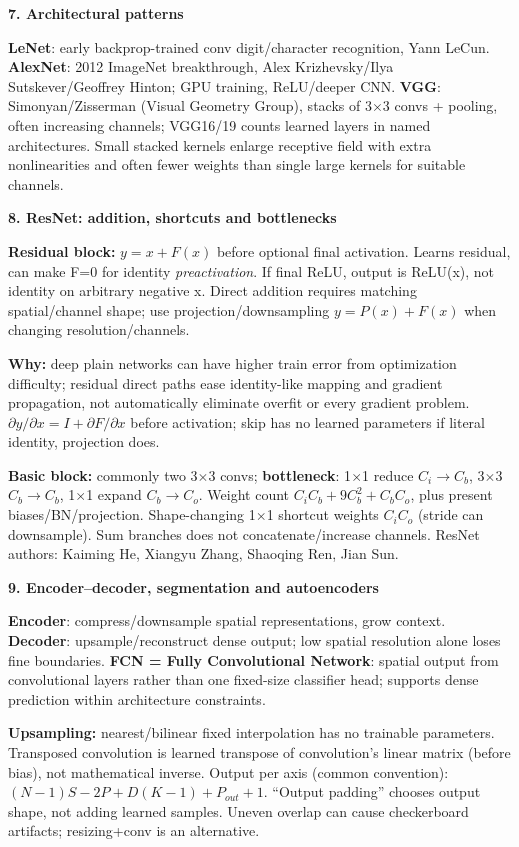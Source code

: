 \documentclass[a4paper]{article}
\newcommand{\key}[1]{\textbf{#1}}
\newcommand{\Topic}[1]{\par\vspace{1.7pt}\noindent
  {\fontsize{7.7}{8.0}\selectfont\bfseries #1}\par\vspace{0.3pt}}
\newcounter{sheet}
\newcounter{sheetcolumn}
\newlength{\colwidth}
\newenvironment{sheetcol}[1][7.0]{\stepcounter{sheetcolumn}
  \begin{lrbox}{\columnbox}\begin{minipage}[t]{\colwidth}\vspace{0pt}
  \fontsize{#1}{\dimexpr#1pt+0.6pt\relax}\selectfont}
  {\end{minipage}\end{lrbox}
  \typeout{CV1COL|\thesheet|\thesheetcolumn|\the\dimexpr\ht\columnbox+\dp\columnbox\relax}
  \usebox{\columnbox}\ignorespacesafterend}
\begin{document}
\begin{sheetcol}
\Topic{7. Architectural patterns}
\key{LeNet}: early backprop-trained conv digit/character recognition, Yann LeCun. \key{AlexNet}: 2012 ImageNet breakthrough, Alex Krizhevsky/Ilya Sutskever/Geoffrey Hinton; GPU training, ReLU/deeper CNN. \key{VGG}: Simonyan/Zisserman (Visual Geometry Group), stacks of 3\(\times\)3 convs + pooling, often increasing channels; VGG16/19 counts learned layers in named architectures. Small stacked kernels enlarge receptive field with extra nonlinearities and often fewer weights than single large kernels for suitable channels.

\Topic{8. ResNet: addition, shortcuts and bottlenecks}
\key{Residual block:} \(y=x+F(x)\) before optional final activation. Learns residual, can make F=0 for identity \emph{preactivation}. If final ReLU, output is ReLU(x), not identity on arbitrary negative x. Direct addition requires matching spatial/channel shape; use projection/downsampling \(y=P(x)+F(x)\) when changing resolution/channels.

\key{Why:} deep plain networks can have higher train error from optimization difficulty; residual direct paths ease identity-like mapping and gradient propagation, not automatically eliminate overfit or every gradient problem. \(\partial y/\partial x=I+\partial F/\partial x\) before activation; skip has no learned parameters if literal identity, projection does.

\key{Basic block:} commonly two 3\(\times\)3 convs; \key{bottleneck}: 1\(\times\)1 reduce \(C_i\to C_b\), 3\(\times\)3 \(C_b\to C_b\), 1\(\times\)1 expand \(C_b\to C_o\). Weight count \(C_iC_b+9C_b^2+C_bC_o\), plus present biases/BN/projection. Shape-changing 1\(\times\)1 shortcut weights \(C_iC_o\) (stride can downsample). Sum branches does not concatenate/increase channels. ResNet authors: Kaiming He, Xiangyu Zhang, Shaoqing Ren, Jian Sun.

\Topic{9. Encoder--decoder, segmentation and autoencoders}
\key{Encoder}: compress/downsample spatial representations, grow context. \key{Decoder}: upsample/reconstruct dense output; low spatial resolution alone loses fine boundaries. \key{FCN = Fully Convolutional Network}: spatial output from convolutional layers rather than one fixed-size classifier head; supports dense prediction within architecture constraints.

\key{Upsampling:} nearest/bilinear fixed interpolation has no trainable parameters. Transposed convolution is learned transpose of convolution's linear matrix (before bias), not mathematical inverse. Output per axis (common convention): \((N-1)S-2P+D(K-1)+P_{out}+1\). ``Output padding'' chooses output shape, not adding learned samples. Uneven overlap can cause checkerboard artifacts; resizing+conv is an alternative.


\end{sheetcol}
\end{document}
